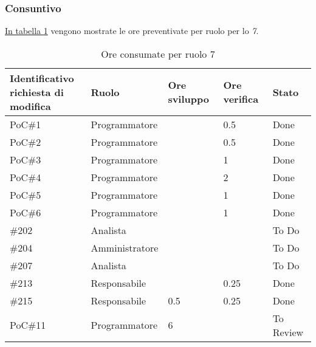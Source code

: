\subsubsection{Consuntivo}
\hyperref[tab:sprint7_ore_consumate]{In tabella \ref{tab:sprint7_ore_consumate}} vengono mostrate le ore preventivate per ruolo per lo \textit{ 7}.

\begin{table}[H]
    \centering
    \begin{tabular}{| l | l | l | l | l |}
        \hline
            \makecell{\textbf{Identificativo} \\ \textbf{richiesta di modifica}} &
            \textbf{Ruolo} &
            \textbf{Ore sviluppo} &
            \textbf{Ore verifica} &
            \textbf{Stato}\\
        \hline
        PoC\#1 & Programmatore &  & 0.5 & Done\\
        \hline
        PoC\#2 & Programmatore &  & 0.5 & Done\\
        \hline
        PoC\#3 & Programmatore &  & 1 & Done\\
        \hline
        PoC\#4 & Programmatore &  & 2 & Done\\
        \hline
        PoC\#5 & Programmatore &  & 1 & Done\\
        \hline
        PoC\#6 & Programmatore &  & 1 & Done\\
        \hline
        \#202 & Analista &  &  & To Do\\
        \hline
        \#204 & Amministratore &  &  & To Do\\
        \hline
        \#207 & Analista &  &  & To Do\\
        \hline
        \#213 & Responsabile &  & 0.25 & Done\\
        \hline
        \#215 & Responsabile & 0.5 & 0.25 & Done\\
        \hline
        PoC\#11 & Programmatore & 6 & & To Review\\
        \hline
    \end{tabular}
    \caption{Ore consumate per ruolo  7}
    \label{tab:sprint7_ore_consumate} 
\end{table}